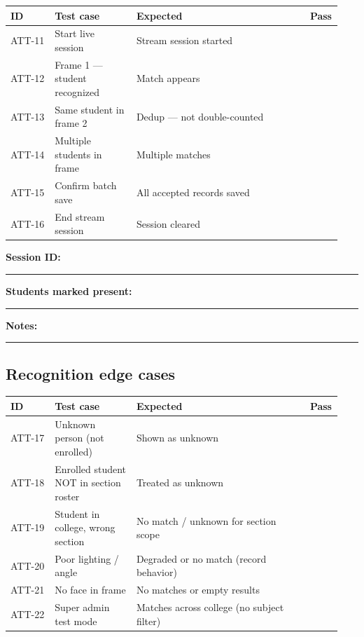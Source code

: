 \documentclass[11pt,a4paper,oneside]{article}
\newcommand{\chk}{\fbox{\rule{0pt}{1.05ex}\rule{1.05ex}{0pt}}}
\newcommand{\fillin}[1][3.5cm]{\rule{#1}{0.4pt}}
\newcommand{\fillinlong}{\rule{0.72\textwidth}{0.4pt}}
\newcommand{\notesblock}{\par\smallskip\noindent\textbf{Notes:}\ \fillinlong\par\smallskip}
\newcommand{\fieldline}[1]{\par\smallskip\noindent\textbf{#1}\ \fillin\par}
\newcommand{\tcheadfour}{%
  \toprule
  \textbf{ID} & \textbf{Test case} & \textbf{Expected} & \textbf{Pass} \\
  \midrule
}
\begin{document}
\small
\begin{tabular}{@{}>{\raggedright\arraybackslash}p{0.13\linewidth} >{\raggedright\arraybackslash}p{0.24\linewidth} >{\raggedright\arraybackslash}p{0.51\linewidth} >{\centering\arraybackslash}p{0.06\linewidth}@{}}
  \tcheadfour
  ATT-11 & Start live session           & Stream session started           & \chk \\
  ATT-12 & Frame 1 — student recognized & Match appears                    & \chk \\
  ATT-13 & Same student in frame 2      & Dedup — not double-counted       & \chk \\
  ATT-14 & Multiple students in frame   & Multiple matches                 & \chk \\
  ATT-15 & Confirm batch save           & All accepted records saved       & \chk \\
  ATT-16 & End stream session           & Session cleared                  & \chk \\
  \bottomrule
\end{tabular}
\normalsize

\fieldline{Session ID:}
\fieldline{Students marked present:}
\notesblock

\subsection{Recognition edge cases}

\small
\begin{tabular}{@{}>{\raggedright\arraybackslash}p{0.13\linewidth} >{\raggedright\arraybackslash}p{0.24\linewidth} >{\raggedright\arraybackslash}p{0.51\linewidth} >{\centering\arraybackslash}p{0.06\linewidth}@{}}
  \tcheadfour
  ATT-17 & Unknown person (not enrolled)           & Shown as unknown                              & \chk \\
  ATT-18 & Enrolled student NOT in section roster  & Treated as unknown                            & \chk \\
  ATT-19 & Student in college, wrong section       & No match / unknown for section scope          & \chk \\
  ATT-20 & Poor lighting / angle                   & Degraded or no match (record behavior)        & \chk \\
  ATT-21 & No face in frame                        & No matches or empty results                   & \chk \\
  ATT-22 & Super admin test mode                   & Matches across college (no subject filter)    & \chk \\
  \bottomrule
\end{tabular}
\normalsize
\end{document}

